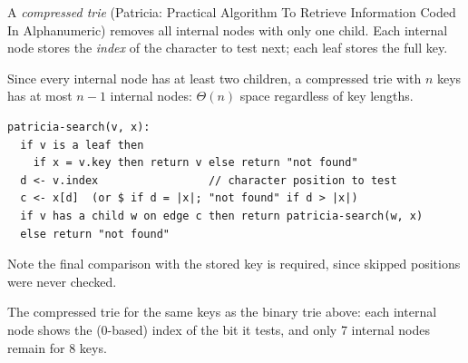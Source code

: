 \begin{definition}
A \emph{compressed trie} (Patricia: Practical Algorithm To Retrieve Information
Coded In Alphanumeric) removes all internal nodes with only one child. Each
internal node stores the \emph{index} of the character to test next; each leaf
stores the full key.
\end{definition}

Since every internal node has at least two children, a compressed trie with $n$
keys has at most $n - 1$ internal nodes: $\Theta(n)$ space regardless of key
lengths.

\begin{lstlisting}
patricia-search(v, x):
  if v is a leaf then
    if x = v.key then return v else return "not found"
  d <- v.index                 // character position to test
  c <- x[d]  (or $ if d = |x|; "not found" if d > |x|)
  if v has a child w on edge c then return patricia-search(w, x)
  else return "not found"
\end{lstlisting}
Note the final comparison with the stored key is required, since skipped
positions were never checked.
\begin{center}
\end{center}
The compressed trie for the same keys as the binary trie above: each internal
node shows the (0-based) index of the bit it tests, and only 7 internal nodes
remain for 8 keys.


